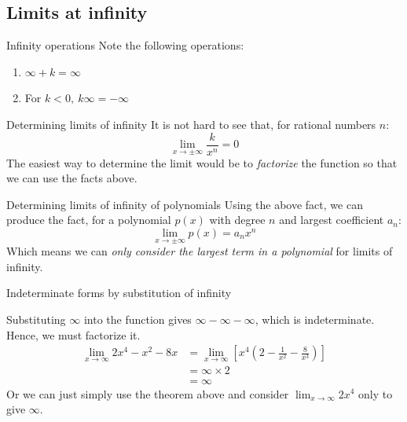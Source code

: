\documentclass{article}
\begin{document}
\subsection{Limits at infinity}
\begin{theorem}
    {Infinity operations}
    Note the following operations:
    \begin{enumerate}
        \item $\infty + k=\infty$
        \item For $k<0,\ k\infty=-\infty$
    \end{enumerate}
\end{theorem}
\begin{knBox}
    {Determining limits of infinity}
    It is not hard to see that, for rational numbers $n$:
    \[\lim_{x\to\pm\infty}\frac{k}{x^n}=0\]
    The easiest way to determine the limit would be to \emph{factorize} the function so that we can use the facts above.
\end{knBox}
\begin{theorem}
    {Determining limits of infinity of polynomials}
    Using the above fact, we can produce the fact, for a polynomial $p(x)$ with degree $n$ and largest coefficient $a_n$:
    \[\lim_{x\to\pm\infty}p(x)=a_nx^n\]
    Which means we can \emph{only consider the largest term in a polynomial} for limits of infinity.
\end{theorem}
\begin{example}
    Indeterminate forms by substitution of infinity

    Substituting $\infty$ into the function gives $\infty-\infty-\infty$, which is indeterminate. Hence, we must factorize it.
    \begin{align*}
        \lim_{x\to\infty}2x^4-x^2-8x & =\lim_{x\to\infty}[x^4(2-\frac{1}{x^2}-\frac{8}{x^3})] \\
                                     & =\infty\times 2                                        \\
                                     & =\infty
    \end{align*}
    Or we can just simply use the theorem above and consider $\lim_{x\to\infty}2x^4$ only to give $\infty$.
\end{example}
\end{document}
